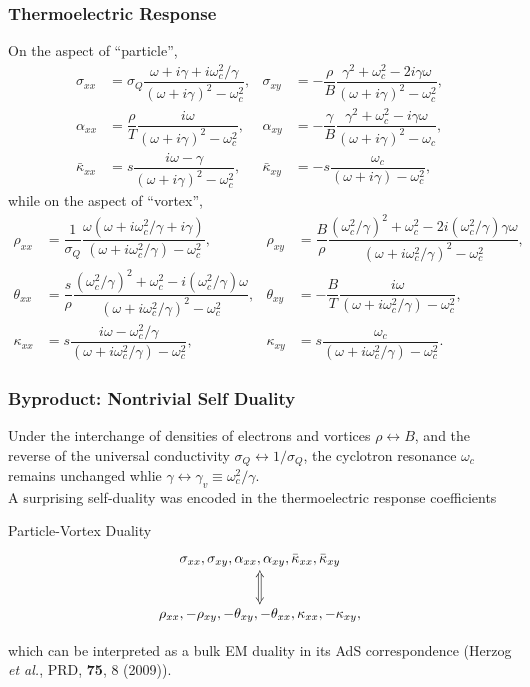 \documentclass[10pt,aspectratio=43,xcolor=x11names,t]{beamer}%
\begin{document}
		\begin{frame}\frametitle{Thermoelectric Response}
			On the aspect of ``particle'',
				\begin{align*}
					\sigma_{xx}&=\sigma_Q\dfrac{\omega+i\gamma+i\omega_c^2/\gamma}{(\omega+i\gamma)^2-\omega_c^2},&\sigma_{xy}&=-\dfrac{\rho}{B}\dfrac{\gamma^2+\omega_c^2-2i\gamma\omega}{(\omega+i\gamma)^2-\omega_c^2},\\
					\alpha_{xx}&=\dfrac{\rho}{T}\dfrac{i\omega}{(\omega+i\gamma)^2-\omega_c^2},&\alpha_{xy}&=-\dfrac{\gamma}{B}\dfrac{\gamma^2+\omega_c^2-i\gamma\omega}{(\omega+i\gamma)^2-\omega_c},\\
					\bar{\kappa}_{xx}&=s\dfrac{i\omega-\gamma}{(\omega+i\gamma)^2-\omega_c^2},&\bar{\kappa}_{xy}&=-s\dfrac{\omega_c}{(\omega+i\gamma)-\omega_c^2},
				\end{align*}
			while on the aspect of ``vortex'',
			\begin{align*}
				\rho_{xx}&=\dfrac{1}{\sigma_Q}\dfrac{\omega(\omega+i\omega_c^2/\gamma+i\gamma)}{(\omega+i\omega_c^2/\gamma)-\omega_c^2},&\rho_{xy}&=\dfrac{B}{\rho}\dfrac{(\omega_c^2/\gamma)^2+\omega_c^2-2i(\omega_c^2/\gamma)\gamma\omega}{(\omega+i\omega_c^2/\gamma)^2-\omega_c^2},\\
				\theta_{xx}&=\dfrac{s}{\rho}\dfrac{(\omega_c^2/\gamma)^2+\omega_c^2-i(\omega_c^2/\gamma)\omega}{(\omega+i\omega_c^2/\gamma)^2-\omega_c^2},&\theta_{xy}&=-\dfrac{B}{T}\dfrac{i\omega}{(\omega+i\omega_c^2/\gamma)-\omega_c^2},\\
				\kappa_{xx}&=s\dfrac{i\omega-\omega_c^2/\gamma}{(\omega+i\omega_c^2/\gamma)-\omega_c^2},&\kappa_{xy}&=s\dfrac{\omega_c}{(\omega+i\omega_c^2/\gamma)-\omega_c^2}.
			\end{align*}
		\end{frame}

		\begin{frame}\frametitle{Byproduct: Nontrivial Self Duality}
			Under the interchange of densities of electrons and vortices $\rho\leftrightarrow B$, and the reverse of the universal conductivity $\sigma_Q\leftrightarrow 1/\sigma_Q$, the cyclotron resonance $\omega_c$ remains unchanged whlie $\gamma\leftrightarrow\gamma_v\equiv\omega_c^2/\gamma$.\\
			\pause
			\vspace{1.5em}
			A surprising self-duality was encoded in the thermoelectric response coefficients
			\begin{redblock}{Particle-Vortex Duality}
				\begin{equation*}
					\xymatrix{\sigma_{xx}, \sigma_{xy}, \alpha_{xx}, \alpha_{xy}, \bar{\kappa}_{xx}, \bar{\kappa}_{xy} \ar@2{<->}[d] \\ \rho_{xx},-\rho_{xy},-\theta_{xy},-\theta_{xx},\kappa_{xx},-\kappa_{xy},}
				\end{equation*}
			\end{redblock}
			which can be interpreted as a bulk EM duality in its AdS correspondence ({\scriptsize Herzog \textit{et al.}, PRD, \textbf{75}, 8 (2009)}).
		\end{frame}
\end{document}
